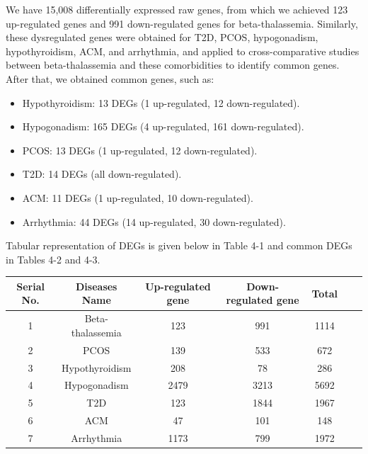 We have 15,008 differentially expressed raw genes, from which we achieved 123 up-regulated genes and 991 down-regulated genes for beta-thalassemia. Similarly, these dysregulated genes were obtained for T2D, PCOS, hypogonadism, hypothyroidism, ACM, and arrhythmia, and applied to cross-comparative studies between beta-thalassemia and these comorbidities to identify common genes. After that, we obtained common genes, such as:
\begin{itemize}
    \item Hypothyroidism: 13 DEGs (1 up-regulated, 12 down-regulated).
    \item Hypogonadism: 165 DEGs (4 up-regulated, 161 down-regulated).
    \item PCOS: 13 DEGs (1 up-regulated, 12 down-regulated).
    \item T2D: 14 DEGs (all down-regulated).
    \item ACM: 11 DEGs (1 up-regulated, 10 down-regulated).
    \item Arrhythmia: 44 DEGs (14 up-regulated, 30 down-regulated).
\end{itemize}
Tabular representation of DEGs is given below in Table 4-1 and common DEGs in Tables 4-2 and 4-3.

\begin{table}[H]
    \centering
    \begin{tabular}{ccccccc}
        \toprule
        Serial No. & Diseases Name & Up-regulated gene & Down-regulated gene & Total \\
        \midrule
        1 & Beta-thalassemia & 123 & 991 & 1114 \\
        2 & PCOS & 139 & 533 & 672 \\
        3 & Hypothyroidism & 208 & 78 & 286 \\
        4 & Hypogonadism & 2479 & 3213 & 5692 \\
        5 & T2D & 123 & 1844 & 1967 \\
        6 & ACM & 47 & 101 & 148 \\
        7 & Arrhythmia & 1173 & 799 & 1972 \\
        \bottomrule
    \end{tabular}
    
    \label{tab:deg_info}
\end{table}


